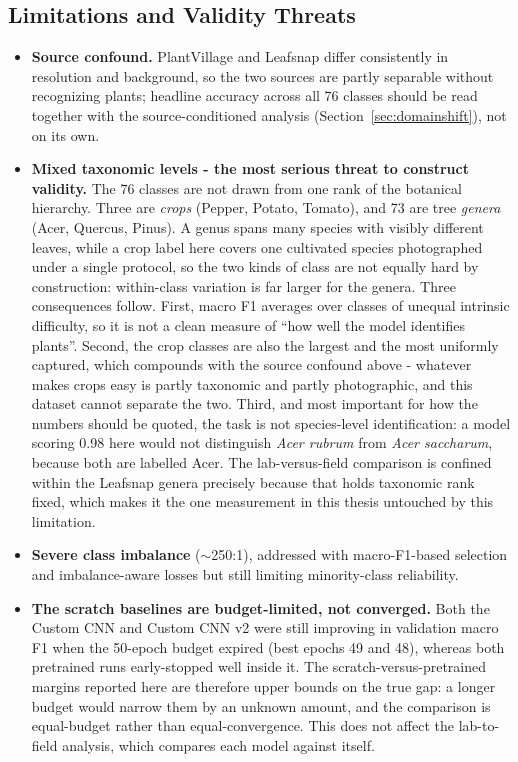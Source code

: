 \documentclass[12pt,a4paper]{article}
\begin{document}
\subsection{Limitations and Validity Threats}
\begin{itemize}
    \item \textbf{Source confound.} PlantVillage and Leafsnap differ consistently in resolution and background, so the two sources are partly separable without recognizing plants; headline accuracy across all 76 classes should be read together with the source-conditioned analysis (Section~\ref{sec:domainshift}), not on its own.
    \item \textbf{Mixed taxonomic levels - the most serious threat to construct validity.} The 76 classes are not drawn from one rank of the botanical hierarchy. Three are \emph{crops} (Pepper, Potato, Tomato), and 73 are tree \emph{genera} (Acer, Quercus, Pinus). A genus spans many species with visibly different leaves, while a crop label here covers one cultivated species photographed under a single protocol, so the two kinds of class are not equally hard by construction: within-class variation is far larger for the genera. Three consequences follow. First, macro F1 averages over classes of unequal intrinsic difficulty, so it is not a clean measure of ``how well the model identifies plants''. Second, the crop classes are also the largest and the most uniformly captured, which compounds with the source confound above - whatever makes crops easy is partly taxonomic and partly photographic, and this dataset cannot separate the two. Third, and most important for how the numbers should be quoted, the task is not species-level identification: a model scoring 0.98 here would not distinguish \emph{Acer rubrum} from \emph{Acer saccharum}, because both are labelled Acer. The lab-versus-field comparison is confined within the Leafsnap genera precisely because that holds taxonomic rank fixed, which makes it the one measurement in this thesis untouched by this limitation.
    \item \textbf{Severe class imbalance} ($\sim$250:1), addressed with macro-F1-based selection and imbalance-aware losses but still limiting minority-class reliability.
    \item \textbf{The scratch baselines are budget-limited, not converged.} Both the Custom CNN and Custom CNN v2 were still improving in validation macro F1 when the 50-epoch budget expired (best epochs 49 and 48), whereas both pretrained runs early-stopped well inside it. The scratch-versus-pretrained margins reported here are therefore upper bounds on the true gap: a longer budget would narrow them by an unknown amount, and the comparison is equal-budget rather than equal-convergence. This does not affect the lab-to-field analysis, which compares each model against itself.

\end{itemize}
\end{document}
